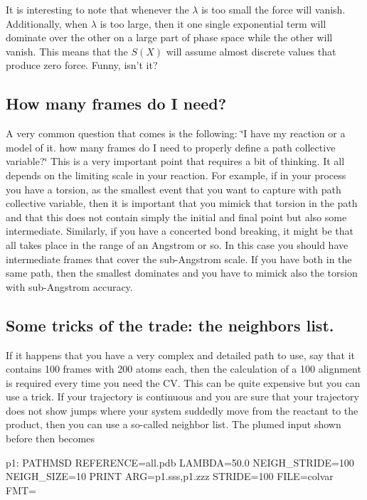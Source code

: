 It is interesting to note that whenever the $ \lambda $ is too small the force will vanish. Additionally, when $ \lambda $ is too large, then it one single exponential term will dominate over the other on a large part of phase space while the other will vanish. This means that the $ S(X) $ will assume almost discrete values that produce zero force. Funny, isn't it?\hypertarget{belfast-2_belfast-2-howmany}{}\subsection{How many frames do I need?}\label{belfast-2_belfast-2-howmany}
A very common question that comes is the following\+: \char`\"{}\+I have my reaction or a model of it. how many frames do I need to properly define a path collective variable?\char`\"{} This is a very important point that requires a bit of thinking. It all depends on the limiting scale in your reaction. For example, if in your process you have a torsion, as the smallest event that you want to capture with path collective variable, then it is important that you mimick that torsion in the path and that this does not contain simply the initial and final point but also some intermediate. Similarly, if you have a concerted bond breaking, it might be that all takes place in the range of an Angstrom or so. In this case you should have intermediate frames that cover the sub-\/\+Angstrom scale. If you have both in the same path, then the smallest dominates and you have to mimick also the torsion with sub-\/\+Angstrom accuracy.\hypertarget{belfast-2_belfast-2-pcvs-tricks}{}\subsection{Some tricks of the trade\+: the neighbors list.}\label{belfast-2_belfast-2-pcvs-tricks}
If it happens that you have a very complex and detailed path to use, say that it contains 100 frames with 200 atoms each, then the calculation of a 100 alignment is required every time you need the C\+V. This can be quite expensive but you can use a trick. If your trajectory is continuous and you are sure that your trajectory does not show jumps where your system suddedly move from the reactant to the product, then you can use a so-\/called neighbor list. The plumed input shown before then becomes

\begin{DoxyVerb}p1: PATHMSD REFERENCE=all.pdb LAMBDA=50.0 NEIGH_STRIDE=100 NEIGH_SIZE=10 
PRINT ARG=p1.sss,p1.zzz STRIDE=100 FILE=colvar FMT=%
\end{DoxyVerb}


